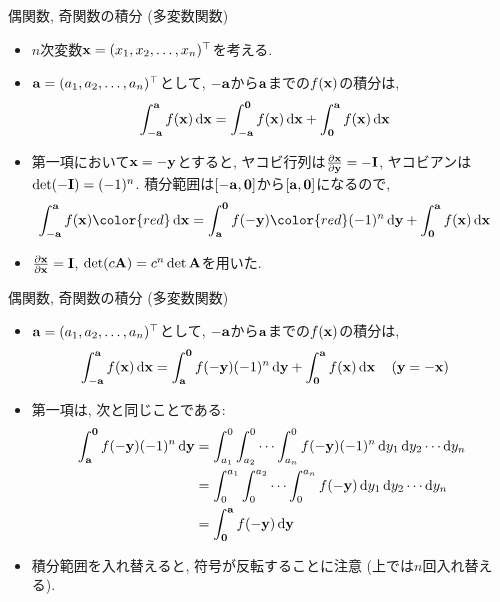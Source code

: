 \documentclass[dvipdfmx,notheorems,t]{beamer}
\begin{document}
\begin{frame}{偶関数, 奇関数の積分 (多変数関数)}
\begin{itemize}
  \item $n$次変数$\vb{x} = (x_1, x_2, \ldots, x_n)^\top$を考える.
  \item $\vb{a} = (a_1, a_2, \ldots, a_n)^\top$として, $-\vb{a}$から$\vb{a}$までの$f(\vb{x})$の積分は,
  \begin{align*}
    \int_{-\vb{a}}^{\vb{a}} f(\vb{x}) \dd{\vb{x}}
      &= \int_{-\vb{a}}^{\vb{0}} f(\vb{x}) \dd{\vb{x}}
        + \int_{\vb{0}}^{\vb{a}} f(\vb{x}) \dd{\vb{x}}
  \end{align*}
  \item 第一項において$\vb{x} = -\vb{y}$とすると,
  ヤコビ行列は$\pdv{\vb{x}}{\vb{y}} = -\vb{I}$, ヤコビアンは$\det(-\vb{I}) = (-1)^n$.
  積分範囲は$[-\vb{a}, \vb{0}]$から$[\vb{a}, \vb{0}]$になるので,
  \begin{align*}
    \int_{-\vb{a}}^{\vb{a}} f(\vb{x}) {\color{red} \dd{\vb{x}}}
      &= \int_{\vb{a}}^{\vb{0}} f(-\vb{y}) {\color{red} (-1)^n \dd{\vb{y}}}
        + \int_{\vb{0}}^{\vb{a}} f(\vb{x}) \dd{\vb{x}}
  \end{align*}
  \item $\pdv{\vb{x}}{\vb{x}} = \vb{I}$, $\det(c \vb{A}) = c^n \det \vb{A}$を用いた.
\end{itemize}
\end{frame}

\begin{frame}{偶関数, 奇関数の積分 (多変数関数)}
\begin{itemize}
  \item $\vb{a} = (a_1, a_2, \ldots, a_n)^\top$として, $-\vb{a}$から$\vb{a}$までの$f(\vb{x})$の積分は,
  \begin{align*}
    \int_{-\vb{a}}^{\vb{a}} f(\vb{x}) \dd{\vb{x}}
      &= \int_{\vb{a}}^{\vb{0}} f(-\vb{y}) (-1)^n \dd{\vb{y}}
        + \int_{\vb{0}}^{\vb{a}} f(\vb{x}) \dd{\vb{x}} \quad (\vb{y} = -\vb{x})
  \end{align*}
  \item 第一項は, 次と同じことである:
  \begin{align*}
    \int_{\vb{a}}^{\vb{0}} f(-\vb{y}) (-1)^n \dd{\vb{y}}
      &= \int_{a_1}^0 \int_{a_2}^0 \cdots \int_{a_n}^0 f(-\vb{y})
        (-1)^n \dd{y_1} \dd{y_2} \cdots \dd{y_n} \\
      &= \int_0^{a_1} \int_0^{a_2} \cdots \int_0^{a_n} f(-\vb{y})
        \dd{y_1} \dd{y_2} \cdots \dd{y_n} \\
      &= \int_{\vb{0}}^{\vb{a}} f(-\vb{y}) \dd{\vb{y}}
  \end{align*}
  \item 積分範囲を入れ替えると, 符号が反転することに注意 (上では$n$回入れ替える).
\end{itemize}
\end{frame}
\end{document}
